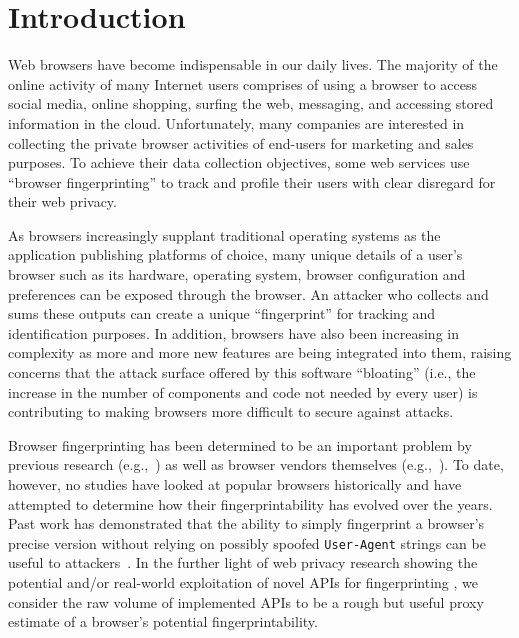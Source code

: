 \section{Introduction}
\label{sec:introduction}

Web browsers have become indispensable in our daily lives. The
majority of the online activity of many Internet users comprises of
using a browser to access social media, online shopping, surfing the
web, messaging, and accessing stored information in the cloud.
Unfortunately, many companies are interested in collecting
the private browser activities of end-users for marketing and sales
purposes. To achieve their data collection objectives, some web
services use ``browser fingerprinting'' to track and profile their
users with clear disregard for their web privacy.

As browsers increasingly supplant traditional operating systems as the
application publishing platforms of choice, 
many unique details of a user's browser such as its hardware,
operating system, browser configuration and preferences can be exposed
through the browser. An attacker who collects and sums these outputs
can create a unique ``fingerprint'' for tracking and identification
purposes. In addition, browsers have also been increasing in
complexity as more and more new features are being integrated into
them, raising concerns that the attack surface offered by this
software ``bloating'' (i.e., the increase in the number of components
and code not needed by every user) is contributing to making browsers
more difficult to secure against attacks.

Browser fingerprinting has been determined to be an important problem
by previous research
(e.g.,~\cite{cookiemonster-SP13,panopticlick,mowery2012pixel,fpdetective})
as well as browser vendors themselves (e.g.,~\cite{safari-privacy,brave-fpbudget,FirefoxFingerprinting}).
 To date, however, no
studies have looked at popular browsers historically and have
attempted to determine how their fingerprintability has evolved over
the years.
Past work has demonstrated that the ability to simply fingerprint a browser's precise version without relying on possibly spoofed \texttt{User-Agent} strings can be useful to attackers~\cite{schwarz2019javascript}.
In the further light of web privacy research showing the potential and/or real-world exploitation of novel APIs for fingerprinting \cite{olejnik2017battery,acar2014web,englehardt2016online}, we consider the raw volume of implemented APIs to be a rough but useful proxy estimate of a browser's potential fingerprintability.


